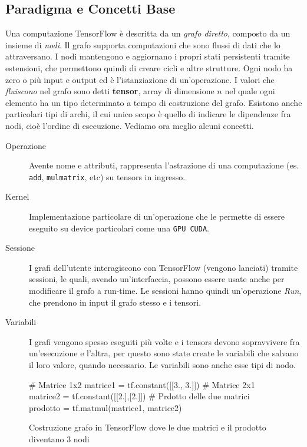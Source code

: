 \documentclass[DIV=calc, paper=a4, fontsize=11pt]{scrartcl}	 %
\begin{document}
\begin{multicols}{2}
		\section{Paradigma e Concetti Base}
			Una computazione TensorFlow è descritta da un \textit{grafo diretto}, composto da un insieme di \textit{nodi}. Il grafo supporta computazioni che sono flussi di dati che lo attraversano. I nodi mantengono e aggiornano i propri stati persistenti tramite estensioni, che permettono quindi di creare cicli e altre strutture. Ogni nodo ha zero o più input e output ed è l'istanziazione di un'operazione. I valori che \textit{fluiscono} nel grafo sono detti \textbf{tensor}, array di dimensione $n$ nel quale ogni elemento ha un tipo determinato a tempo di costruzione del grafo. Esistono anche particolari tipi di archi, il cui unico scopo è quello di indicare le dipendenze fra nodi, cioè l'ordine di esecuzione. Vediamo ora meglio alcuni concetti.
			\begin{description}
				\item[Operazione] Avente nome e attributi, rappresenta l'astrazione di una computazione (es. \texttt{add}, \texttt{mulmatrix}, etc) su tensors in ingresso.
				\item[Kernel] Implementazione particolare di un'operazione che le permette di essere eseguito su device particolari come una \texttt{GPU CUDA}.
				\item[Sessione] I grafi dell'utente interagiscono con TensorFlow (vengono lanciati) tramite sessioni, le quali, avendo un'interfaccia, possono essere usate anche per modificare il grafo a run-time. Le sessioni hanno quindi un'operazione \textit{Run}, che prendono in input il grafo stesso e i tensori.
				\item[Variabili] I grafi vengono spesso eseguiti più volte e i tensors devono sopravvivere fra un'esecuzione e l'altra, per questo sono state create le variabili che salvano il loro valore, quando necessario. Le variabili sono anche esse tipi di nodo.
			\end{description}
		
			\begin{figure*}
				\begin{python}
# Matrice 1x2
matrice1 = tf.constant([[3., 3.]])
# Matrice 2x1
matrice2 = tf.constant([[2.],[2.]])
# Prdotto delle due matrici
prodotto = tf.matmul(matrice1, matrice2)
				\end{python}
				\caption{Costruzione grafo in TensorFlow dove le due matrici e il prodotto diventano 3 nodi}
				\label{py:costruzione}
			\end{figure*}
		

\end{multicols}
\end{document}
